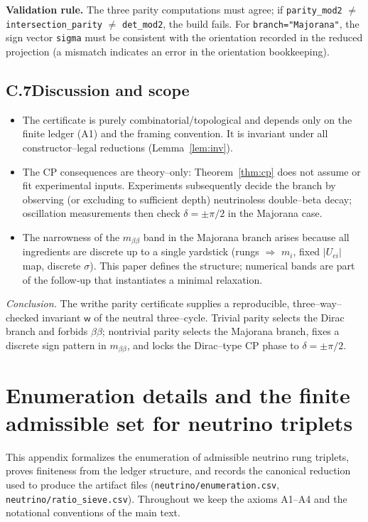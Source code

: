\documentclass[11pt]{article}
\begin{document}
\noindent\textbf{Validation rule.} The three parity computations must agree; if \texttt{parity\_mod2} $\neq$ \texttt{intersection\_parity} $\neq$ \texttt{det\_mod2}, the build fails. For \texttt{branch="Majorana"}, the sign vector \texttt{sigma} must be consistent with the orientation recorded in the reduced projection (a mismatch indicates an error in the orientation bookkeeping).

\subsection*{C.7\quad Discussion and scope}

\begin{itemize}
  \item The certificate is purely combinatorial/topological and depends only on the finite ledger (A1) and the framing convention. It is invariant under all constructor–legal reductions (Lemma~\ref{lem:inv}).
  \item The CP consequences are theory–only: Theorem~\ref{thm:cp} does not assume or fit experimental inputs. Experiments subsequently decide the branch by observing (or excluding to sufficient depth) neutrinoless double–beta decay; oscillation measurements then check $\delta=\pm\pi/2$ in the Majorana case.
  \item The narrowness of the $m_{\beta\beta}$ band in the Majorana branch arises because all ingredients are discrete up to a single yardstick (rungs $\Rightarrow$ $m_i$, fixed $|U_{ei}|$ map, discrete $\sigma$). This paper defines the structure; numerical bands are part of the follow‑up that instantiates a minimal relaxation.
\end{itemize}

\medskip
\noindent\textit{Conclusion.} The writhe parity certificate supplies a reproducible, three–way–checked invariant $\mathsf{w}$ of the neutral three–cycle. Trivial parity selects the Dirac branch and forbids $\beta\beta$; nontrivial parity selects the Majorana branch, fixes a discrete sign pattern in $m_{\beta\beta}$, and locks the Dirac–type CP phase to $\delta=\pm\pi/2$.

\section{Enumeration details and the finite admissible set for neutrino triplets}

This appendix formalizes the enumeration of admissible neutrino rung triplets, proves finiteness from the ledger structure, and records the canonical reduction used to produce the artifact files (\texttt{neutrino/enumeration.csv}, \texttt{neutrino/ratio\_sieve.csv}). Throughout we keep the axioms A1–A4 and the notational conventions of the main text.
\end{document}
